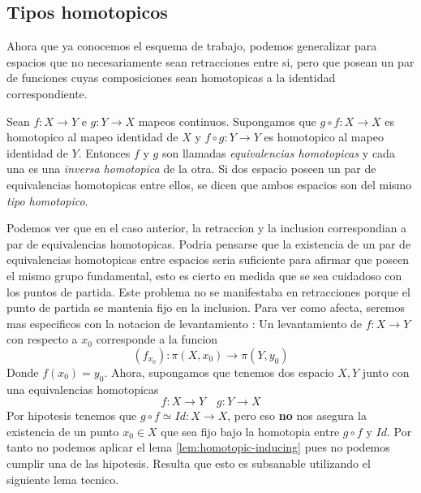 \subsection{Tipos homotopicos}
Ahora que ya conocemos el esquema de trabajo, podemos generalizar para
espacios que no necesariamente sean retracciones entre si, pero que
posean un par de funciones cuyas composiciones sean homotopicas a la
identidad correspondiente.
\begin{definicion}
  Sean \(f : X \to Y\) e \(g : Y \to X\) mapeos continuos. Supongamos
  que \( g \circ f : X \to X \) es homotopico al mapeo identidad de
  \(X\) y \( f \circ g : Y \to Y \) es homotopico al mapeo identidad de
  \(Y\). Entonces \(f\) y \(g\) son llamadas \emph{equivalencias
  homotopicas} y cada una es una \emph{inversa homotopica} de la otra.
  Si dos espacio poseen un par de equivalencias homotopicas entre ellos,
  se dicen que ambos espacios son del mismo \emph{tipo homotopico}.
\end{definicion}
Podemos ver que en el caso anterior, la retraccion y la inclusion
correspondian a par de equivalencias homotopicas. Podria pensarse que la
existencia de un par de equivalencias homotopicas entre espacios seria
suficiente para afirmar que poseen el mismo grupo fundamental, esto es
cierto en medida que se sea cuidadoso con los puntos de partida. Este
problema no se manifestaba en retracciones porque el punto de partida se
mantenia fijo en la inclusion. Para ver como afecta, seremos mas
especificos con la notacion de levantamiento : Un levantamiento de \(f :
X \to Y\) con respecto a \(x_0\) corresponde a la funcion
\[ (f_{x_0}) : \pi (X , x_0) \to \pi (Y, y_0)\]
Donde \(f(x_0) = y_0\). Ahora, supongamos que tenemos dos espacio \(X,
Y\) junto con una equivalencias homotopicas
\[ f : X \to Y \quad g : Y \to X \]
Por hipotesis tenemos que \(g \circ f \simeq Id : X \to X\), pero eso
\textbf{no} nos asegura la existencia de un punto \(x_0 \in X\) que sea
fijo bajo la homotopia entre \( g \circ f\) y \(Id\). Por tanto no
podemos aplicar el lema \ref{lem:homotopic-inducing} pues no podemos
cumplir una de las hipotesis. Resulta que esto es subsanable utilizando
el siguiente lema tecnico.

